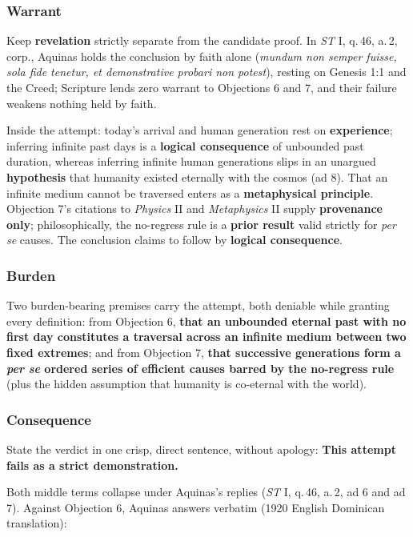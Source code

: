 \subsubsection*{Warrant}

Keep \textbf{revelation} strictly separate from the candidate proof. In \emph{ST} I, q.\,46, a.\,2, corp., Aquinas holds the conclusion by faith alone (\emph{mundum non semper fuisse, sola fide tenetur, et demonstrative probari non potest}), resting on Genesis 1:1 and the Creed; Scripture lends zero warrant to Objections 6 and 7, and their failure weakens nothing held by faith.

Inside the attempt: today's arrival and human generation rest on \textbf{experience}; inferring infinite past days is a \textbf{logical consequence} of unbounded past duration, whereas inferring infinite human generations slips in an unargued \textbf{hypothesis} that humanity existed eternally with the cosmos (ad 8). That an infinite medium cannot be traversed enters as a \textbf{metaphysical principle}. Objection 7's citations to \emph{Physics} II and \emph{Metaphysics} II supply \textbf{provenance only}; philosophically, the no-regress rule is a \textbf{prior result} valid strictly for \emph{per se} causes. The conclusion claims to follow by \textbf{logical consequence}.

\subsubsection*{Burden}

Two burden-bearing premises carry the attempt, both deniable while granting every definition: from Objection 6, \textbf{that an unbounded eternal past with no first day constitutes a traversal across an infinite medium between two fixed extremes}; and from Objection 7, \textbf{that successive generations form a \emph{per se} ordered series of efficient causes barred by the no-regress rule} (plus the hidden assumption that humanity is co-eternal with the world).

\subsubsection*{Consequence}

State the verdict in one crisp, direct sentence, without apology: \textbf{This attempt fails as a strict demonstration.}

Both middle terms collapse under Aquinas's replies (\emph{ST} I, q.\,46, a.\,2, ad 6 and ad 7). Against Objection 6, Aquinas answers verbatim (1920 English Dominican translation):

